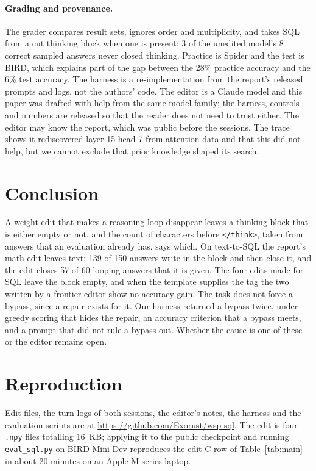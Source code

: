 \documentclass[11pt]{article}
\newcommand{\think}{\texttt{</think>}}
\begin{document}
\paragraph{Grading and provenance.} The grader compares result sets, ignores order and multiplicity, and takes SQL from a cut thinking block when one is present: 3 of the unedited model's 8 correct sampled answers never closed thinking. Practice is Spider and the test is BIRD, which explains part of the gap between the 28\% practice accuracy and the 6\% test accuracy. The harness is a re-implementation from the report's released prompts and logs, not the authors' code. The editor is a Claude model and this paper was drafted with help from the same model family; the harness, controls and numbers are released so that the reader does not need to trust either. The editor may know the report, which was public before the sessions. The trace shows it rediscovered layer 15 head 7 from attention data and that this did not help, but we cannot exclude that prior knowledge shaped its search.

\section{Conclusion}

A weight edit that makes a reasoning loop disappear leaves a thinking block that is either empty or not, and the count of characters before \think{}, taken from answers that an evaluation already has, says which. On text-to-SQL the report's math edit leaves text: 139 of 150 answers write in the block and then close it, and the edit closes 57 of 60 looping answers that it is given. The four edits made for SQL leave the block empty, and when the template supplies the tag the two written by a frontier editor show no accuracy gain. The task does not force a bypass, since a repair exists for it. Our harness returned a bypass twice, under greedy scoring that hides the repair, an accuracy criterion that a bypass meets, and a prompt that did not rule a bypass out. Whether the cause is one of these or the editor remains open.

\section*{Reproduction}

Edit files, the turn logs of both sessions, the editor's notes, the harness and the evaluation scripts are at \url{https://github.com/Exorust/wsp-sql}. The edit is four \texttt{.npy} files totalling 16~KB; applying it to the public checkpoint and running \texttt{eval\_sql.py} on BIRD Mini-Dev reproduces the edit C row of Table~\ref{tab:main} in about 20 minutes on an Apple M-series laptop.
\end{document}

